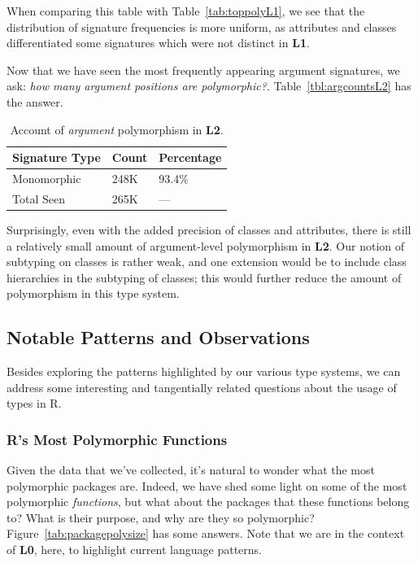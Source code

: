 \documentclass[acmsmall,10pt,review,anonymous]{acmart}\settopmatter{printfolios=true,printccs=false,printacmref=false}
\begin{document}

When comparing this table with Table~\ref{tab:toppolyL1}, we see that the distribution of signature frequencies is more uniform, as attributes and classes differentiated some signatures which were not distinct in {\bf L1}.

Now that we have seen the most frequently appearing argument signatures, we ask: {\it how many argument positions are polymorphic?}.
Table~\ref{tbl:argcountsL2} has the answer.

\begin{table}[ht]
\label{tab:argcountsL2}
\centering
\begin{tabular}{lll}
  \hline
Signature Type & Count & Percentage \\ 
  \hline
  Monomorphic & 248K & 93.4\% \\ 
  Total Seen & 265K & --- \\ 
   \hline
\end{tabular}
\caption{Account of {\it argument} polymorphism in {\bf L2}.}
\end{table}

Surprisingly, even with the added precision of classes and attributes, there is still a relatively small amount of argument-level polymorphism in {\bf L2}.
Our notion of subtyping on classes is rather weak, and one extension would be to include class hierarchies in the subtyping of classes;
this would further reduce the amount of polymorphism in this type system.



%
%
%
%
\subsection{Notable Patterns and Observations}

Besides exploring the patterns highlighted by our various type systems, we can address some interesting and tangentially related questions about the usage of types in R.

%
%
%
%
\subsubsection{R's Most Polymorphic Functions}

Given the data that we've collected, it's natural to wonder what the most polymorphic packages are.
Indeed, we have shed some light on some of the most polymorphic {\it functions}, but what about the packages that these functions belong to?
What is their purpose, and why are they so polymorphic?
Figure~\ref{tab:packagepolysize} has some answers.
Note that we are in the context of {\bf L0}, here, to highlight current language patterns.
\end{document}
